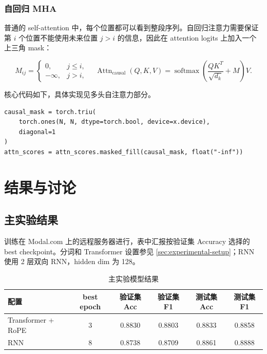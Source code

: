 \documentclass{ctexart}
\begin{document}
\subsubsection{自回归 MHA}

普通的 self-attention 中，每个位置都可以看到整段序列。自回归注意力需要保证第 $i$ 个位置不能使用未来位置 $j>i$ 的信息，因此在 attention logits 上加入一个上三角 mask：

\begin{equation}
M_{ij} =
\begin{cases}
0, & j \le i, \\
-\infty, & j > i,
\end{cases}
\quad
\operatorname{Attn}_{\text{causal}}(Q,K,V)
= \operatorname{softmax}\left(\frac{QK^T}{\sqrt{d_k}} + M\right)V .
\end{equation}


核心代码如下，具体实现见多头自注意力部分。

\begin{verbatim}
causal_mask = torch.triu(
    torch.ones(N, N, dtype=torch.bool, device=x.device),
    diagonal=1
)
attn_scores = attn_scores.masked_fill(causal_mask, float("-inf"))
\end{verbatim}

\section{结果与讨论}

\subsection{主实验结果}

训练在 Modal.com 上的远程服务器进行，表中汇报按验证集 Accuracy 选择的 best checkpoint。分词和 Transformer 设置参见 \ref{sec:experimental-setup}；RNN 使用 2 层双向 RNN，hidden dim 为 128。

\begin{table}[htbp]
    \centering
    \begin{tabular}{lccccc}
        \toprule
        配置 & best epoch & 验证集 Acc & 验证集 F1 & 测试集 Acc & 测试集 F1 \\
        \midrule
        Transformer + RoPE & 3 & 0.8830 & 0.8803 & 0.8833 & 0.8858 \\
        RNN & 8 & 0.8738 & 0.8709 & 0.8861 & 0.8888 \\
        \bottomrule
    \end{tabular}
    \caption{主实验模型结果}
    \label{tab:main-results}
\end{table}
\end{document}

